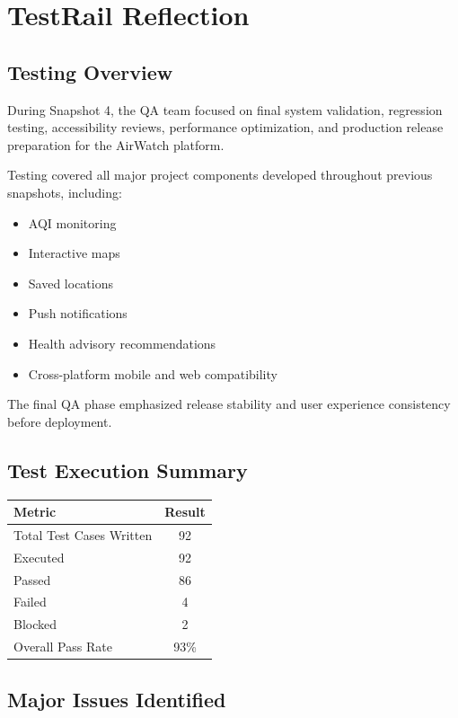 \section{TestRail Reflection}

\subsection{Testing Overview}

During Snapshot 4, the QA team focused on final system validation, regression testing, accessibility reviews, performance optimization, and production release preparation for the AirWatch platform.

Testing covered all major project components developed throughout previous snapshots, including:
\begin{itemize}
    \item AQI monitoring
    \item Interactive maps
    \item Saved locations
    \item Push notifications
    \item Health advisory recommendations
    \item Cross-platform mobile and web compatibility
\end{itemize}

The final QA phase emphasized release stability and user experience consistency before deployment.

\subsection{Test Execution Summary}

\begin{table}[h]
\centering
\begin{tabular}{|l|c|}
\hline
\textbf{Metric} & \textbf{Result} \\
\hline
Total Test Cases Written & 92 \\
Executed & 92 \\
Passed & 86 \\
Failed & 4 \\
Blocked & 2 \\
Overall Pass Rate & 93\% \\
\hline
\end{tabular}
\end{table}

\subsection{Major Issues Identified}

